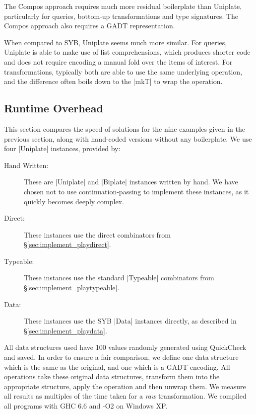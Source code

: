 \documentclass[preprint]{sigplanconf}
\begin{document}
The Compos approach requires much more residual boilerplate than Uniplate, particularly for queries, bottom-up transformations and type signatures. The Compos approach also requires a GADT representation.

When compared to SYB, Uniplate seems much more similar. For queries, Uniplate is able to make use of list comprehensions, which produces shorter code and does not require encoding a manual fold over the items of interest. For transformations, typically both are able to use the same underlying operation, and the difference often boils down to the |mkT| to wrap the operation.


\subsection{Runtime Overhead}
\label{sec:results_speed}

This section compares the speed of solutions for the nine examples given in the previous section, along with hand-coded versions without any boilerplate. We use four |Uniplate| instances, provided by:

\begin{description}
\item[Hand Written:] These are |Uniplate| and |Biplate| instances written by hand. We have chosen not to use continuation-passing to implement these instances, as it quickly becomes deeply complex.
\item[Direct:] These instances use the direct combinators from \S\ref{sec:implement_playdirect}.
\item[Typeable:] These instances use the standard |Typeable| combinators from \S\ref{sec:implement_playtypeable}.
\item[Data:] These instances use the SYB |Data| instances directly, as described in \S\ref{sec:implement_playdata}.
\end{description}

All data structures used have 100 values randomly generated using QuickCheck \citep{quickcheck} and saved. In order to ensure a fair comparison, we define one data structure which is the same as the original, and one which is a GADT encoding. All operations take these original data structures, transform them into the appropriate structure, apply the operation and then unwrap them. We measure all results as multiples of the time taken for a \textit{raw} transformation. We compiled all programs with GHC 6.6 and -O2 on Windows XP.
\end{document}
